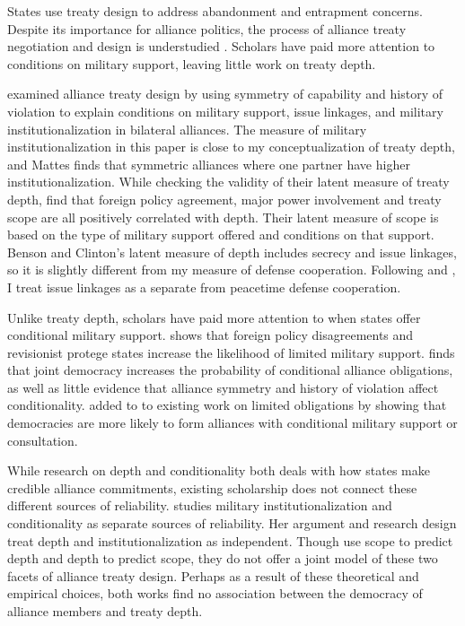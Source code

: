 \documentclass[12pt]{article}
\begin{document}
States use treaty design to address abandonment and entrapment concerns. 
Despite its importance for alliance politics, the process of alliance treaty negotiation and design is understudied \citep{Poast2019a}. 
Scholars have paid more attention to conditions on military support, leaving little work on treaty depth. 


\citet{Mattes2012} examined alliance treaty design by using symmetry of capability and history of violation to explain conditions on military support, issue linkages, and military institutionalization in bilateral alliances. 
The measure of military institutionalization in this paper \citep{LeedsAnac2005} is close to my conceptualization of treaty depth, and Mattes finds that symmetric alliances where one partner have higher institutionalization. 
While checking the validity of their latent measure of treaty depth, \citet{BensonClinton2016} find that foreign policy agreement, major power involvement and treaty scope are all positively correlated with depth. 
Their latent measure of scope is based on the type of military support offered and conditions on that support. 
Benson and Clinton's latent measure of depth includes secrecy and issue linkages, so it is slightly different from my measure of defense cooperation. 
Following \citet{Mattes2012} and \citet{Poast2012}, I treat issue linkages as a separate from peacetime defense cooperation.


Unlike treaty depth, scholars have paid more attention to when states offer conditional military support. 
\citet{Benson2012} shows that foreign policy disagreements and revisionist protege states increase the likelihood of limited military support.
\citet{Mattes2012} finds that joint democracy increases the probability of conditional alliance obligations, as well as little evidence that alliance symmetry and history of violation affect conditionality. 
\citet{Chibaetal2015} added to to existing work on limited obligations by showing that democracies are more likely to form alliances with conditional military support or consultation. 


While research on depth and conditionality both deals with how states make credible alliance commitments, existing scholarship does not connect these different sources of reliability.  
\citet{Mattes2012} studies military institutionalization and conditionality as separate sources of reliability. 
Her argument and research design treat depth and institutionalization as independent.
Though \citet{BensonClinton2016} use scope to predict depth and depth to predict scope, they do not offer a joint model of these two facets of alliance treaty design. 
Perhaps as a result of these theoretical and empirical choices, both works find no association between the democracy of alliance members and treaty depth. 
\end{document}

